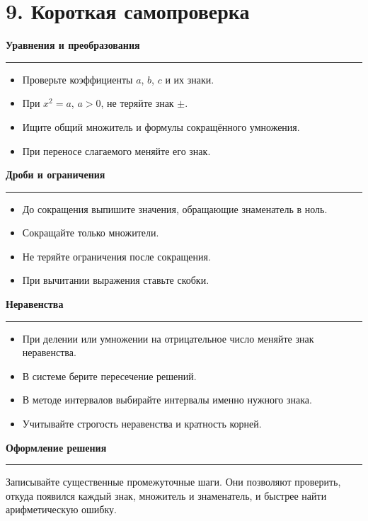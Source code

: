 \documentclass[a4paper,12pt]{article}
\newcommand{\keyidea}[1]{%
  \par\medskip
  {\bfseries\color{darkaccent}#1}\par
  \vspace{1pt}
  {\color{accent}\rule{\linewidth}{0.55pt}}\par
  \vspace{2pt}
}
\begin{document}
\clearpage
\endgroup

\section{9. Короткая самопроверка}

\keyidea{Уравнения и преобразования}
\begin{itemize}[leftmargin=8mm,itemsep=1.5mm,topsep=2mm]
  \item Проверьте коэффициенты \(a\), \(b\), \(c\) и их знаки.
  \item При \(x^2=a\), \(a>0\), не теряйте знак \(\pm\).
  \item Ищите общий множитель и формулы сокращённого умножения.
  \item При переносе слагаемого меняйте его знак.
\end{itemize}

\keyidea{Дроби и ограничения}
\begin{itemize}[leftmargin=8mm,itemsep=1.5mm,topsep=2mm]
  \item До сокращения выпишите значения, обращающие знаменатель в ноль.
  \item Сокращайте только множители.
  \item Не теряйте ограничения после сокращения.
  \item При вычитании выражения ставьте скобки.
\end{itemize}

\keyidea{Неравенства}
\begin{itemize}[leftmargin=8mm,itemsep=1.5mm,topsep=2mm]
  \item При делении или умножении на отрицательное число меняйте знак неравенства.
  \item В системе берите пересечение решений.
  \item В методе интервалов выбирайте интервалы именно нужного знака.
  \item Учитывайте строгость неравенства и кратность корней.
\end{itemize}

\keyidea{Оформление решения}
Записывайте существенные промежуточные шаги. Они позволяют проверить, откуда появился каждый знак, множитель и знаменатель, и быстрее найти арифметическую ошибку.

\clearpage
\end{document}
